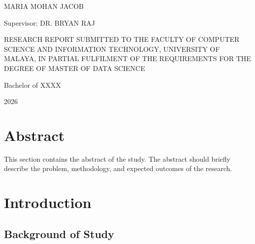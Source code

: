 \documentclass[12pt]{report}
\begin{document}
\begin{titlepage}
\centering

\vspace{2cm}

{\Huge \textbf {}}

\vspace{2cm}

{\Large MARIA MOHAN JACOB}

\vspace{1cm}

{\Large Supervisor: DR. BRYAN RAJ}

\vfill

{\Large
RESEARCH REPORT SUBMITTED TO THE FACULTY OF COMPUTER SCIENCE AND INFORMATION TECHNOLOGY, UNIVERSITY OF MALAYA, IN PARTIAL FULFILMENT OF THE REQUIREMENTS FOR THE DEGREE OF MASTER OF DATA SCIENCE
}

\vspace{1cm}

{\Large Bachelor of XXXX}

\vspace{2cm}

{\Large 2026}

\end{titlepage}





\chapter*{Abstract}

This section contains the abstract of the study. The abstract should briefly describe the problem, methodology, and expected outcomes of the research.

\tableofcontents
\newpage

\chapter{Introduction}

\section{Background of Study}
\end{document}
